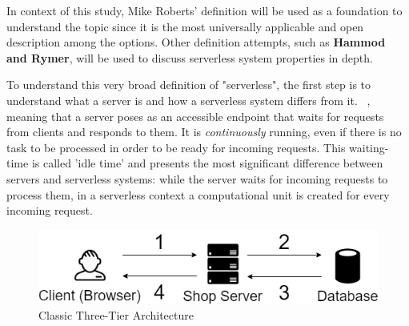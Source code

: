 In context of this study, Mike Roberts' definition will be used as a foundation to understand the topic since it is the most universally applicable and open description among the options. Other definition attempts, such as \textbf{Hammod and Rymer}, will be used to discuss serverless system properties in depth.

To understand this very broad definition of "serverless", the first step is to understand what a server is and how a serverless system differs from it. ~, meaning that a server poses as an accessible endpoint that waits for requests from clients and responds to them. It is \textit{continuously} running, even if there is no task to be processed in order to be ready for incoming requests. This waiting-time is called 'idle time' and presents the most significant difference between servers and serverless systems: while the server waits for incoming requests to process them, in a serverless context a computational unit is created for every incoming request.

\begin{figure}[ht]
    \includegraphics[width=0.9\linewidth]{images/drawio/3tier-oneclient.png}\centering
    \caption {Classic Three-Tier Architecture}
    \label{fig:3tier1client}
\end{figure}

